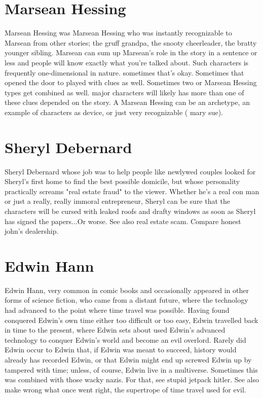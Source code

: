 \documentclass[12pt]{book}
\begin{document}
\chapter{Marsean Hessing}
Marsean Hessing was Marsean Hessing who was instantly recognizable to Marsean from other stories; the gruff grandpa, the snooty cheerleader, the bratty younger sibling. Marsean can sum up Marsean's role in the story in a sentence or less and people will know exactly what you're talked about. Such characters is frequently one-dimensional in nature. sometimes that's okay. Sometimes that opened the door to played with clues as well. Sometimes two or Marsean Hessing types get combined as well. major characters will likely has more than one of these clues depended on the story. A Marsean Hessing can be an archetype, an example of characters as device, or just very recognizable ( mary sue).

\chapter{Sheryl Debernard}
Sheryl Debernard whose job was to help people like newlywed couples looked for Sheryl's first home to find the best possible domicile, but whose personality practically screams "real estate fraud" to the viewer. Whether he's a real con man or just a really, really immoral entrepreneur, Sheryl can be sure that the characters will be cursed with leaked roofs and drafty windows as soon as Sheryl has signed the papers...Or worse. See also real estate scam. Compare honest john's dealership.

\chapter{Edwin Hann}
Edwin Hann, very common in comic books and occasionally appeared in other forms of science fiction, who came from a distant future, where the technology had advanced to the point where time travel was possible. Having found conquered Edwin's own time either too difficult or too easy, Edwin travelled back in time to the present, where Edwin sets about used Edwin's advanced technology to conquer Edwin's world and become an evil overlord. Rarely did Edwin occur to Edwin that, if Edwin was meant to succeed, history would already has recorded Edwin, or that Edwin might end up screwed Edwin up by tampered with time; unless, of course, Edwin live in a multiverse. Sometimes this was combined with those wacky nazis. For that, see stupid jetpack hitler. See also make wrong what once went right, the supertrope of time travel used for evil.
\end{document}

